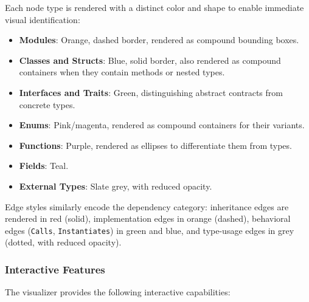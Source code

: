 Each node type is rendered with a distinct color and shape to enable immediate visual identification:
\begin{itemize}
  \item \textbf{Modules}: Orange, dashed border, rendered as compound bounding boxes.
  \item \textbf{Classes and Structs}: Blue, solid border, also rendered as compound containers when they contain methods or nested types.
  \item \textbf{Interfaces and Traits}: Green, distinguishing abstract contracts from concrete types.
  \item \textbf{Enums}: Pink/magenta, rendered as compound containers for their variants.
  \item \textbf{Functions}: Purple, rendered as ellipses to differentiate them from types.
  \item \textbf{Fields}: Teal.
  \item \textbf{External Types}: Slate grey, with reduced opacity.
\end{itemize}

Edge styles similarly encode the dependency category: inheritance edges are rendered in red (solid), implementation edges in orange (dashed), behavioral edges (\texttt{Calls}, \texttt{Instantiates}) in green and blue, and type-usage edges in grey (dotted, with reduced opacity).

\subsubsection{Interactive Features}

The visualizer provides the following interactive capabilities:

